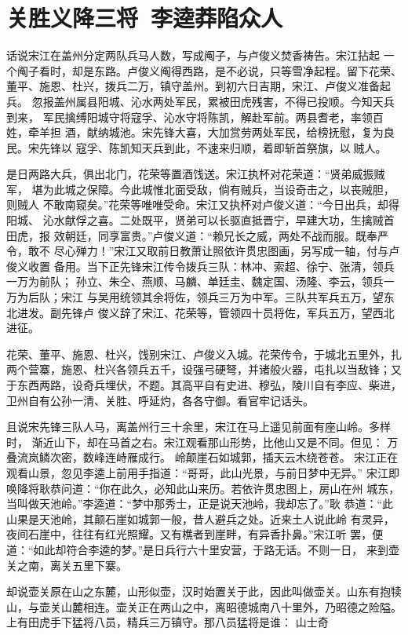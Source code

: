 \chapter{关胜义降三将~李逵莽陷众人}

话说宋江在盖州分定两队兵马人数，写成阄子，与卢俊义焚香祷告。宋江拈起
一个阄子看时，却是东路。卢俊义阄得西路，是不必说，只等雪净起程。留下花荣、
董平、施恩、杜兴，拨兵二万，镇守盖州。到初六日吉期，宋江、卢俊义准备起兵。
忽报盖州属县阳城、沁水两处军民，累被田虎残害，不得已投顺。今知天兵到来，
军民擒缚阳城守将寇孚、沁水守将陈凯，解赴军前。两县耆老，率领百姓，牵羊担
酒，献纳城池。宋先锋大喜，大加赏劳两处军民，给榜抚慰，复为良民。宋先锋以
寇孚、陈凯知天兵到此，不速来归顺，着即斩首祭旗，以贼人。

是日两路大兵，俱出北门，花荣等置酒饯送。宋江执杯对花荣道：“贤弟威振贼军，
堪为此城之保障。今此城惟北面受敌，倘有贼兵，当设奇击之，以丧贼胆，则贼人
不敢南窥矣。”花荣等唯唯受命。宋江又执杯对卢俊义道：“今日出兵，却得阳城、
沁水献俘之喜。二处既平，贤弟可以长驱直抵晋宁，早建大功，生擒贼首田虎，报
效朝廷，同享富贵。”卢俊义道：“赖兄长之威，两处不战而服。既奉严令，敢不
尽心殚力！”宋江又取前日教萧让照依许贯忠图画，另写成一轴，付与卢俊义收置
备用。当下正先锋宋江传令拨兵三队：林冲、索超、徐宁、张清，领兵一万为前队；
孙立、朱仝、燕顺、马麟、单廷圭、魏定国、汤隆、李云，领兵一万为后队；宋江
与吴用统领其余将佐，领兵三万为中军。三队共军兵五万，望东北进发。副先锋卢
俊义辞了宋江、花荣等，管领四十员将佐，军兵五万，望西北进征。

花荣、董平、施恩、杜兴，饯别宋江、卢俊义入城。花荣传令，于城北五里外，扎
两个营寨，施恩、杜兴各领兵五千，设强弓硬弩，并诸般火器，屯扎以当敌锋；又
于东西两路，设奇兵埋伏，不题。其高平自有史进、穆弘，陵川自有李应、柴进，
卫州自有公孙一清、关胜、呼延灼，各各守御。看官牢记话头。

且说宋先锋三队人马，离盖州行三十余里，宋江在马上遥见前面有座山岭。多样时，
渐近山下，却在马首之右。宋江观看那山形势，比他山又是不同。但见：
万叠流岚鳞次密，数峰连峙雁成行。
岭颠崖石如城郭，插天云木绕苍苍。
宋江正在观看山景，忽见李逵上前用手指道：“哥哥，此山光景，与前日梦中无异。”
宋江即唤降将耿恭问道：“你在此久，必知此山来历。若依许贯忠图上，房山在州
城东，当叫做天池岭。”李逵道：“梦中那秀士，正是说天池岭，我却忘了。”耿
恭道：“此山果是天池岭，其颠石崖如城郭一般，昔人避兵之处。近来土人说此岭
有灵异，夜间石崖中，往往有红光照耀。又有樵者到崖畔，有异香扑鼻。”宋江听
罢，便道：“如此却符合李逵的梦。”是日兵行六十里安营，于路无话。不则一日，
来到壶关之南，离关五里下寨。

却说壶关原在山之东麓，山形似壶，汉时始置关于此，因此叫做壶关。山东有抱犊
山，与壶关山麓相连。壶关正在两山之中，离昭德城南八十里外，乃昭德之险隘。
上有田虎手下猛将八员，精兵三万镇守。那八员猛将是谁：
山士奇

